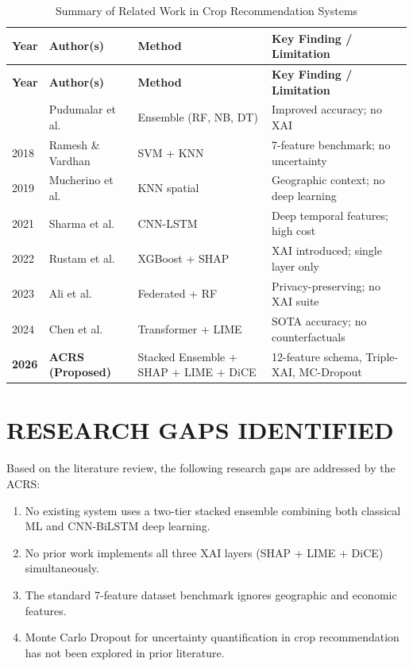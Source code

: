 \documentclass[12pt,a4paper,oneside]{report}
\begin{document}
\begin{longtable}{p{1.5cm} p{3.5cm} p{3.0cm} p{5.0cm}}
\caption{Summary of Related Work in Crop Recommendation Systems}
\label{tab:litreview}\\
\toprule
\textbf{Year} & \textbf{Author(s)} & \textbf{Method} & \textbf{Key Finding / Limitation} \\
\midrule
\endfirsthead
\toprule
\textbf{Year} & \textbf{Author(s)} & \textbf{Method} & \textbf{Key Finding / Limitation} \\
\midrule
\endhead
\bottomrule
\endlastfoot
2016 & Pudumalar et al. & Ensemble (RF, NB, DT) & Improved accuracy; no XAI \\[4pt]
2018 & Ramesh \& Vardhan & SVM + KNN & 7-feature benchmark; no uncertainty \\[4pt]
2019 & Mucherino et al. & KNN spatial & Geographic context; no deep learning \\[4pt]
2021 & Sharma et al. & CNN-LSTM & Deep temporal features; high cost \\[4pt]
2022 & Rustam et al. & XGBoost + SHAP & XAI introduced; single layer only \\[4pt]
2023 & Ali et al. & Federated + RF & Privacy-preserving; no XAI suite \\[4pt]
2024 & Chen et al. & Transformer + LIME & SOTA accuracy; no counterfactuals \\[4pt]
\textbf{2026} & \textbf{ACRS (Proposed)} & Stacked Ensemble + SHAP + LIME + DiCE & 12-feature schema, Triple-XAI, MC-Dropout \\
\end{longtable}

\section{RESEARCH GAPS IDENTIFIED}

Based on the literature review, the following research gaps are addressed by the ACRS:
\begin{enumerate}[leftmargin=*, label=\arabic*.]
  \item No existing system uses a two-tier stacked ensemble combining both classical ML and CNN-BiLSTM deep learning.
  \item No prior work implements all three XAI layers (SHAP + LIME + DiCE) simultaneously.
  \item The standard 7-feature dataset benchmark ignores geographic and economic features.
  \item Monte Carlo Dropout for uncertainty quantification in crop recommendation has not been explored in prior literature.
\end{enumerate}
\end{document}
